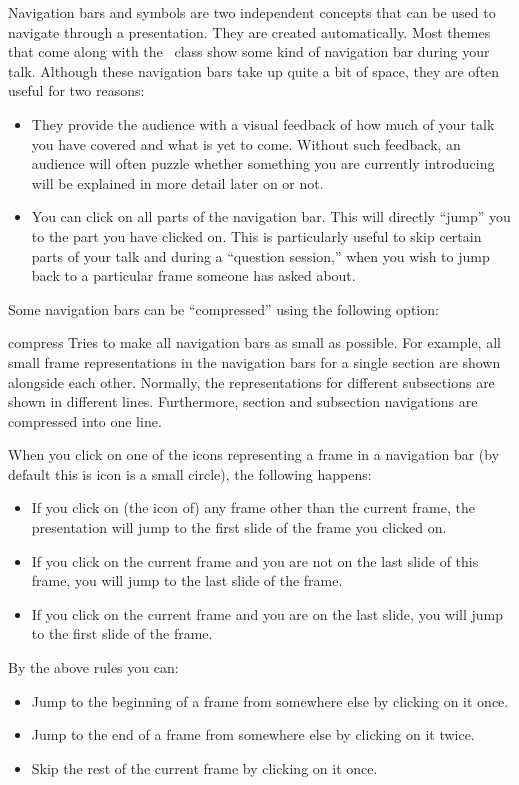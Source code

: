 Navigation bars and symbols are two independent concepts that can be
used to navigate through a presentation. They are created
automatically. Most themes that come along with the \beamer\ class
show some kind of navigation bar during your talk. Although these
navigation bars take up quite a bit of space, they are often useful
for two reasons: 

\begin{itemize}
\item
  They provide the audience with a visual feedback of how much of your
  talk you have covered and what is yet to come. Without such
  feedback, an audience will often puzzle whether something you are
  currently introducing will be explained in more detail later on or
  not.
\item
  You can click on all parts of the navigation bar. This will directly
  ``jump'' you to the part you have clicked on. This is particularly
  useful to skip certain parts of your talk and during a ``question
  session,'' when you wish to jump back to a particular frame someone
  has asked about.
\end{itemize}

Some navigation bars can be ``compressed'' using the following option:

\begin{classoption}{compress}
  Tries to make all navigation bars as small as possible. For example,
  all small frame representations in the navigation bars for a single
  section are shown alongside each other. Normally, the representations
  for different subsections are shown in different lines. Furthermore,
  section and subsection navigations are compressed into one line.
\end{classoption}

When you click on one of the icons representing a frame in a
navigation bar (by default this is icon is a small circle), the
following happens: 
\begin{itemize}
\item
  If you click on (the icon of) any frame other than the current frame, the
  presentation will jump to the first slide of the frame you clicked
  on.
\item
  If you click on the current frame and you are not on the last slide
  of this frame, you will jump to the last slide of the frame.
\item
  If you click on the current frame and you are on the last slide, you
  will jump to the first slide of the frame.
\end{itemize}
By the above rules you can:
\begin{itemize}
\item
  Jump to the beginning of a frame from somewhere else by clicking on
  it once.  
\item
  Jump to the end of a frame from somewhere else by clicking on it
  twice.
\item
  Skip the rest of the current frame by clicking on it once.
\end{itemize}

